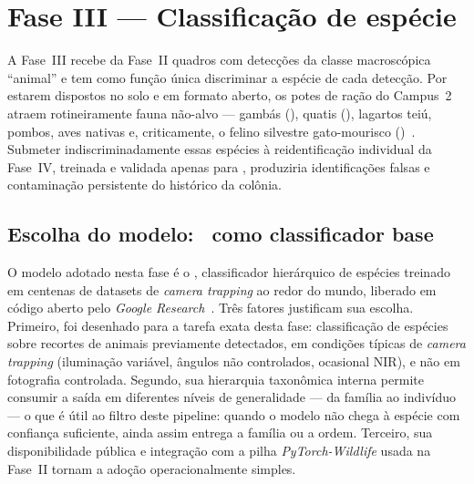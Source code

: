 \section{Fase III --- Classificação de espécie}
\label{sec:pipeline-fase3}

A Fase~III recebe da Fase~II quadros com detecções da classe macroscópica ``animal'' e tem como função única discriminar a espécie de cada detecção. Por estarem dispostos no solo e em formato aberto, os potes de ração do Campus~2 atraem rotineiramente fauna não-alvo --- gambás (), quatis (), lagartos teiú, pombos, aves nativas e, criticamente, o felino silvestre gato-mourisco ()~\cite{goncalves2025wildcat,cove2022capital}. Submeter indiscriminadamente essas espécies à reidentificação individual da Fase~IV, treinada e validada apenas para , produziria identificações falsas e contaminação persistente do histórico da colônia.

\subsection*{Escolha do modelo: \modeloSN~como classificador base}

O modelo adotado nesta fase é o \modeloSN, classificador hierárquico de espécies treinado em centenas de datasets de \emph{camera trapping} ao redor do mundo, liberado em código aberto pelo \emph{Google Research}~\cite{google_speciesnet_blog}. Três fatores justificam sua escolha. Primeiro, foi desenhado para a tarefa exata desta fase: classificação de espécies sobre recortes de animais previamente detectados, em condições típicas de \emph{camera trapping} (iluminação variável, ângulos não controlados, ocasional NIR), e não em fotografia controlada. Segundo, sua hierarquia taxonômica interna permite consumir a saída em diferentes níveis de generalidade --- da família ao indivíduo --- o que é útil ao filtro deste pipeline: quando o modelo não chega à espécie com confiança suficiente, ainda assim entrega a família ou a ordem. Terceiro, sua disponibilidade pública e integração com a pilha \emph{PyTorch-Wildlife} usada na Fase~II tornam a adoção operacionalmente simples.

